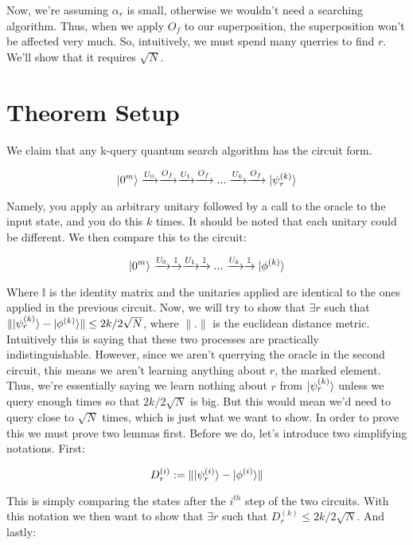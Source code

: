 \documentclass[11pt]{article}
\begin{document}
Now, we're assuming $\alpha_r$ is small, otherwise we wouldn't need a searching algorithm. Thus, when we apply $O_f$ to our superposition, the superposition won't be affected very much. So, intuitively, we must spend many querries to find $r$. We'll show that it requires $\sqrt{N}$.

\section{Theorem Setup}

We claim that any k-query quantum search algorithm has the circuit form.

{
\[\ket{0^m} \xrightarrow{U_0}\xrightarrow{O_f}\xrightarrow{U_1}\xrightarrow{O_f}...\xrightarrow{U_k}\xrightarrow{O_f} \ket{\psi_r^{(k)}}\]
}

Namely, you apply an arbitrary unitary followed by a call to the oracle to the input state, and you do this $k$ times. It should be noted that each unitary could be different. We then compare this to the circuit:

{
\[\ket{0^m} \xrightarrow{U_0}\xrightarrow{\mathbb{I}}\xrightarrow{U_1}\xrightarrow{\mathbb{I}}...\xrightarrow{U_k}\xrightarrow{\mathbb{I}} \ket{\phi^{(k)}}\]
}

Where $\mathbb{I}$ is the identity matrix and the unitaries applied are identical to the ones applied in the previous circuit. Now, we will try to show that $\exists r$ such that $\lVert \ket{\psi_r^{(k)}} - \ket{\phi^{(k)}} \rVert \leq 2k/2\sqrt{N}$, where $\lVert \text{.} \rVert$ is the euclidean distance metric. Intuitively this is saying that these two processes are practically indistinguishable. However, since we aren't querrying the oracle in the second circuit, this means we aren't learning anything about $r$, the marked element. Thus, we're essentially saying we learn nothing about $r$ from $\ket{\psi_r^{(k)}}$ unless we query enough times so that $2k/2\sqrt{N}$ is big. But this would mean we'd need to query close to $\sqrt{N}$ times, which is just what we want to show. In order to prove this we must prove two lemmas first. Before we do, let's introduce two simplifying notations. First: 

{
\[D^{(i)}_r := \lVert \ket{\psi_r^{(i)}} - \ket{\phi^{(i)}} \rVert \]
}

This is simply comparing the states after the $i^{th}$ step of the two circuits. With this notation we then want to show that $\exists r$ such that $D^{(k)}_r \leq 2k/2\sqrt{N}$. And lastly:
\end{document}
